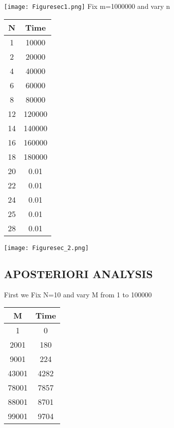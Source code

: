 \documentclass[conference]{IEEEtran}
\begin{document}
\texttt{[image: Figuresec1.png]}
\newline
Fix m=1000000 and vary n
\begin{center}
   \begin{tabular}{|c|c|}
   \hline
   N & Time \\
   \hline\hline
    1 & 10000 \\
    \hline
    2 & 20000 \\
    \hline
    4 & 40000 \\
    \hline
    6 & 60000 \\
    \hline
    8 & 80000 \\
    \hline
    12& 120000 \\
    \hline
    14 & 140000 \\
    \hline
    16 & 160000 \\
    \hline
    18 & 180000 \\
    \hline
    20 & 0.01 \\
    \hline
    22 & 0.01 \\
    \hline
    24 & 0.01 \\
    \hline
    25 & 0.01 \\
    \hline
    28 & 0.01 \\
    \hline
    \end{tabular} 
\end{center}
\texttt{[image: Figuresec\_2.png]}
\newline

\subsection{APOSTERIORI ANALYSIS }

First we Fix N=10 and vary M from 1 to 100000

\begin{center}
   \begin{tabular}{|c|c|}
   \hline
   M & Time \\
   \hline\hline
    1 & 0 \\
    \hline
    2001 & 180 \\
    \hline
    9001 & 224 \\
    \hline
    43001 & 4282 \\
    \hline
    78001 & 7857 \\
    \hline
    88001 & 8701 \\
    \hline
    99001 & 9704 \\
    \hline
    \end{tabular} 
\end{center}
\end{document}
